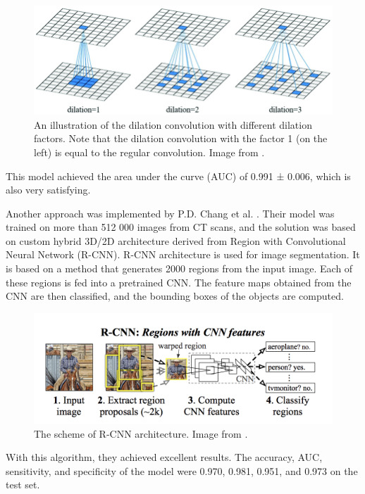\documentclass[thesis=B,english]{FITthesis}[2019/12/23]
\begin{document}
\begin{figure}[ht]
		\includegraphics[scale=0.4]{images/dilation.png}
		\centering
		\caption{An illustration of the dilation convolution with different dilation factors. Note that the dilation convolution with the factor 1 (on the left) is equal to the regular convolution. Image from \cite{cui_zheng_gao_zhang_yang_ren_2019}.}
		\label{fig:dilation}
\end{figure}


This model achieved the area under the curve (AUC) of 0.991 ± 0.006, which is also very satisfying.

Another approach was implemented by P.D. Chang et al. \cite{Chang1609}. Their model was trained on more than 512 000 images from CT scans, and the solution was based on custom hybrid 3D/2D architecture derived from Region with Convolutional Neural Network (R-CNN). R-CNN architecture is used for image segmentation. It is based on a method that generates 2000 regions from the input image. Each of these regions is fed into a pretrained CNN. The feature maps obtained from the CNN are then classified, and the bounding boxes of the objects are computed.\cite{DBLP:journals/corr/GirshickDDM13}

\begin{figure}[ht]
		\includegraphics[scale=0.3]{images/rcnn.png}
		\centering
		\caption{The scheme of R-CNN architecture. Image from \cite{DBLP:journals/corr/GirshickDDM13}.}
\end{figure}

With this algorithm, they achieved excellent results. The accuracy, AUC, sensitivity, and specificity of the model were 0.970, 0.981, 0.951, and 0.973 on the test set.
\end{document}
